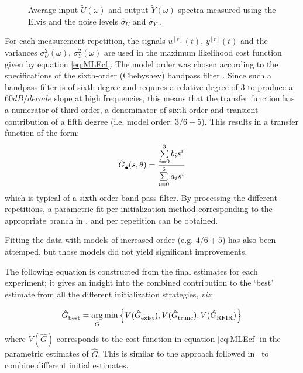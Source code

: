 \begin{figure}
  \centering
  \setlength{\figurewidth}{0.75\columnwidth}
  \setlength{\figureheight}{0.68\figurewidth}
  
  \caption[Measured input/output spectra of \BK{} filter.]{Average input $\tilde{U}(\omega)$ and output $\tilde{Y}(\omega)$ spectra  measured using the Elvis and the noise levels $\hat\sigma_U$ and $\hat\sigma_Y$  .}
  \label{fig:SpectraMeasurement}
\end{figure}

For each measurement repetition, the signals $u^{[r]}(t)$, $y^{[r]}(t)$ and the variances $\sigma_U^2(\omega)$, $\sigma_Y^2(\omega)$ are used in the maximum likelihood cost function given by equation \eqref{eq:MLEcf}.
The model order was chosen according to the specifications of the sixth-order (Chebyshev) bandpass filter \citep{datasheet_bk1613}.
Since such a bandpass filter is of sixth degree and requires a relative degree of 3 to produce a $60 \unit{dB/decade}$ slope at high frequencies, this means that the transfer function has a numerator of third order, a denominator of sixth order and transient contribution of a fifth degree (i.e. model order: $3/6+5$).
This results in a transfer function of the form:
\begin{equation}
  \hat{G}_{\mathrm{\bullet}}^{\mathrm{}}(s,\theta) = 
  \frac{\sum\limits_{i=0}^3 b_i s^i}{\sum\limits_{i=0}^6 a_i s^i}
\end{equation}
which is typical of a sixth-order band-pass filter.
By processing the different repetitions, a parametric fit per initialization method corresponding to the appropriate branch in , and per repetition can be obtained. 
\begin{remark}
Fitting the data with models of increased order (e.g. $4/6+5$) has also been attemped, but those models did not yield significant improvements.
\end{remark}


The following equation is constructed from the final estimates for each experiment; it gives an insight into the combined contribution to the `best' estimate from all the different initialization strategies, \emph{viz}:

\begin{equation}\label{eq:selectBest}
  \hat{G}_{\mathrm{best}}^{\mathrm{}} = 
    \operatorname*{arg}_{\hat{G}} 
    \min 
    \left\{ 
      V(\hat{G}_{\mathrm{exist}}^{\mathrm{}}),
      V(\hat{G}_{\mathrm{trunc}}^{\mathrm{}}),
      V(\hat{G}_{\mathrm{RFIR}}^{\mathrm{}})
    \right\}
\end{equation}
where $V(\hat{G})$ corresponds to the cost function in equation \eqref{eq:MLEcf} in the parametric estimates of $\hat{G}$.
This is similar to the approach followed in~\citep{FDIDENT} to combine different initial estimates.

